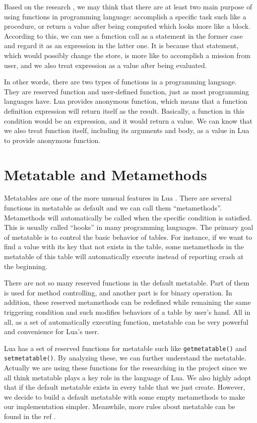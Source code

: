 Based on the research \cite{PIL}, we may think that there are at least two main purpose of using functions in programming language: accomplish a specific task such like a procedure, or return a value after being computed which looks more like a block. According to this, we can use a function call as a statement in the former case and regard it as an expression in the latter one. It is because that statement, which would possibly change the store, is more like to accomplish a mission from user, and we also treat expression as a value after being evaluated.

In other words, there are two types of functions in a programming language. They are reserved function and user-defined function, just as most programming languages have. Lua provides anonymous function, which means that a function definition expression will return itself as the result. Basically, a function in this condition would be an expression, and it would return a value. We can know that we also treat function itself, including its arguments and body, as a value in Lua to provide anonymous function.

\section{Metatable and Metamethods}
Metatables are one of the more unusual features in Lua . There are several functions in metatable as default and we can call them ``metamethods''. Metamethods will automatically be called when the specific condition is satisfied. This is usually called ``hooks'' in many programming languages. The primary goal of metatable is to control the basic behavior of tables. For instance, if we want to find a value with its key that not exists in the table, some metamethods in the metatable of this table will automatically execute instead of reporting crash at the beginning.

There are not so many reserved functions in the default metatable. Part of them is used for method controlling, and another part is for binary operation. In addition, these reserved metamethods can be redefined while remaining the same triggering condition and such modifies behaviors of a table by user's hand. All in all, as a set of automatically executing function, metatable can be very powerful and convenience for Lua's user.

Lua has a set of reserved functions for metatable such like {\tt getmetatable()} and {\tt setmetatable()}. By analyzing these, we can further understand the metatable. Actually we are using these functions for the researching in the project since we all think metatable plays a key role in the language of Lua. We also highly adopt that if the default metatable exists in every table that we just create. However, we decide to build a default metatable with some empty metamethods to make our implementation simpler. Meanwhile, more rules about metatable can be found in the ref \cite{LRM}.

